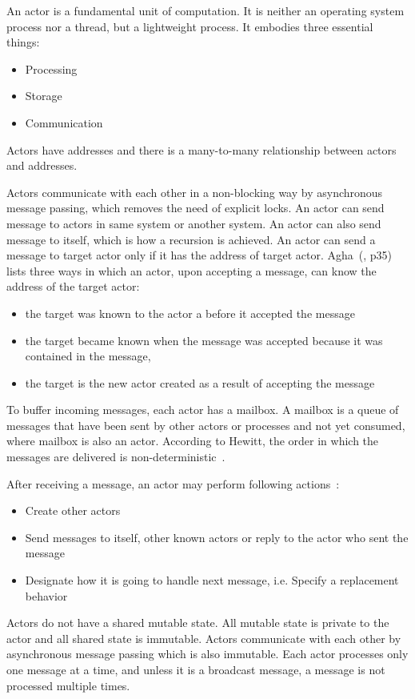   An actor is a fundamental unit of computation. It is neither an operating system process nor a thread, but a lightweight process. It embodies three essential things:
\begin{itemize}
  \item Processing
  \item Storage
  \item Communication
\end{itemize}
  Actors have addresses and there is a many-to-many relationship between actors and addresses.

  Actors communicate with each other in a non-blocking way by asynchronous message passing, which removes the need of explicit locks. An actor can send message to actors in same system or another system. An actor can also send message to itself, which is how a recursion is achieved. An actor can send a message to target actor only if it has the address of target actor. Agha~(\cite{agha}, p35) lists three ways in which an actor, upon accepting a message, can know the address of the target actor:
  \begin{itemize}
    \item the target was known to the actor a before it accepted the message
    \item the target became known when the message was accepted because it was contained in the message,
    \item the target is the new actor created as a result of accepting the message
  \end{itemize}

  To buffer incoming messages, each actor has a mailbox. A mailbox is a queue of messages that have been sent by other actors or processes and not yet consumed, where mailbox is also an actor. According to Hewitt, the order in which the messages are delivered is non-deterministic~\cite{hewittVideo}.

After receiving a message, an actor may perform following actions~\cite{hewitt}:
\begin{itemize}
  \item Create other actors
  \item Send messages to itself, other known actors or reply to the actor who sent the message
  \item Designate how it is going to handle next message, i.e. Specify a replacement behavior
\end{itemize}

  Actors do not have a shared mutable state. All mutable state is private to the actor and all shared state is immutable. Actors communicate with each other by asynchronous message passing which is also immutable. Each actor processes only one message at a time, and unless it is a broadcast message, a message is not processed multiple times.


